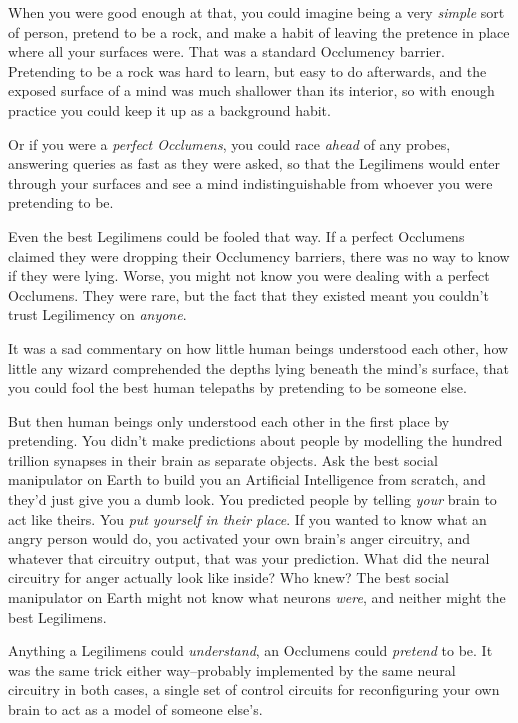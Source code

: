 When you were good enough at that, you could imagine being a very \emph{simple} sort of person, pretend to be a rock, and make a habit of leaving the pretence in place where all your surfaces were. That was a standard Occlumency barrier. Pretending to be a rock was hard to learn, but easy to do afterwards, and the exposed surface of a mind was much shallower than its interior, so with enough practice you could keep it up as a background habit.

Or if you were a \emph{perfect Occlumens}, you could race \emph{ahead} of any probes, answering queries as fast as they were asked, so that the Legilimens would enter through your surfaces and see a mind indistinguishable from whoever you were pretending to be.

Even the best Legilimens could be fooled that way. If a perfect Occlumens claimed they were dropping their Occlumency barriers, there was no way to know if they were lying. Worse, you might not know you were dealing with a perfect Occlumens. They were rare, but the fact that they existed meant you couldn't trust Legilimency on \emph{anyone}.

It was a sad commentary on how little human beings understood each other, how little any wizard comprehended the depths lying beneath the mind's surface, that you could fool the best human telepaths by pretending to be someone else.

But then human beings only understood each other in the first place by pretending. You didn't make predictions about people by modelling the hundred trillion synapses in their brain as separate objects. Ask the best social manipulator on Earth to build you an Artificial Intelligence from scratch, and they'd just give you a dumb look. You predicted people by telling \emph{your} brain to act like theirs. You \emph{put yourself in their place}. If you wanted to know what an angry person would do, you activated your own brain's anger circuitry, and whatever that circuitry output, that was your prediction. What did the neural circuitry for anger actually look like inside? Who knew? The best social manipulator on Earth might not know what neurons \emph{were}, and neither might the best Legilimens.

Anything a Legilimens could \emph{understand}, an Occlumens could \emph{pretend} to be. It was the same trick either way\---probably implemented by the same neural circuitry in both cases, a single set of control circuits for reconfiguring your own brain to act as a model of someone else's.

